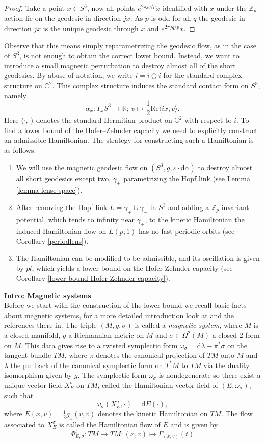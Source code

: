 \documentclass[12pt]{article}
\def\gc{{\gamma}}
\newcommand{\C}{\mathbb{C}} %
\newcommand{\R}{\mathbb{R}} %
\newcommand{\Z}{\mathbb{Z}} %
\newcommand{\dd}{\mathrm{d}}
\begin{document}
\begin{proof}
Take a point $x\in S^3$, now all points $e^{2\pi j q/p}x$ identified with $x$ under the $\Z_p$ action lie on the geodesic in direction $jx$. As $p$ is odd for all $q$ the geodesic in direction $jx$ is the unique geodesic through $x$ and $e^{2\pi jq/p}x$. 
\end{proof}
\noindent
Observe that this means simply reparametrizing the geodesic flow, as in the case of $S^3$, is not enough to obtain the correct lower bound. Instead, we want to introduce a small magnetic perturbation to destroy almost all of the short geodesics.
\noindent
By abuse of notation, we write $i=i\oplus i$ for the standard complex structure on $\C^2$. This complex structure induces the standard contact form on $S^3$, namely
$$
\alpha_x: T_xS^3\to \R;\ v\mapsto \frac{1}{2}\mathrm{Re}\langle ix,v \rangle.
$$
Here $\langle \cdot, \cdot\rangle$ denotes the standard Hermitian product on $\C^2$ with respect to $i$. To find a lower bound of the Hofer--Zehnder capacity we need to explicitly construct an admissible Hamiltonian. The strategy for constructing such a Hamiltonian is as follows: \begin{enumerate}
    \item We will use the magnetic geodesic flow on $\left(S^3, g, \varepsilon\cdot\dd\alpha \right)$ to destroy almost all short geodesics except two, $\gc_{\pm}$ parametrizing the Hopf link (see Lemma \ref{lemma lense space}).
    \item After removing the Hopf link $L=\gc_{+}\cup \gc_{-}$ in $S^3$ and adding a $\Z_p$-invariant potential, which tends to infinity near $\gc_{\pm}$, to the kinetic Hamiltonian the induced Hamiltonian flow on $L(p;1)$ has no fast periodic orbits (see Corollary \ref{periodlens}).
    \item The Hamiltonian can be modified to be admissible, and its oscillation is given by $pl$, which yields a lower bound on the Hofer-Zehnder capacity (see Corollary \ref{lower bound Hofer Zehnder capacity}).
\end{enumerate}
\noindent
\textbf{Intro: Magnetic systems}\\
Before we start with the construction of the lower bound we recall basic facts about magnetic systems, for a more detailed introduction look at \cite{Bd14} and the references there in. The triple $(M,g,\sigma)$ is called a \emph{magnetic system}, where $M$ is a closed manifold, $g$ a Riemannian metric on $M$ and $\sigma\in\Omega^2(M)$ a closed  $2$-form on $M$. This data gives rise to a twisted symplectic form $\omega_{\sigma}=\dd\lambda-\pi^*\sigma$ on the tangent bundle $TM$, where $\pi$  denotes the canonical projection of $TM$ onto $M$ and $\lambda$ the pullback of the canonical symplectic form on $T^*M$ to $TM$ via the duality isomorphism given by $g$. The symplectic form $\omega_{\sigma}$ is nondegenerate so there exist a unique vector field $X_E^{\sigma}$ on $TM$, called the Hamiltonian vector field of $(E, \omega_{\sigma})$, such that $$\omega_{\sigma}\left( X_{E}^{\sigma}, \cdot\right)=\dd E(\cdot),$$ where $E(x,v)=\frac{1}{2}g_x(v,v)$ denotes the kinetic Hamiltonian on $TM$. The flow associated to $X_E^{\sigma}$ is called the Hamiltonian flow of $E$ and is given by \[
\varPhi_{E, \sigma}^t:TM \longrightarrow TM:(x,v)\mapsto \Gamma_{(x,v)}(t)
\]
\end{document}

